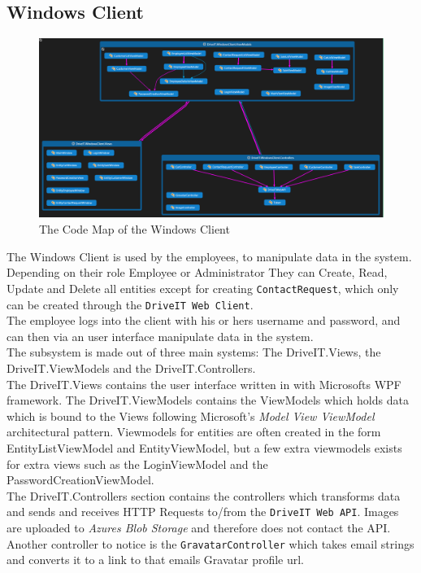 \subsection{Windows Client} 
\begin{figure}[H]
	\centering
	\includegraphics[width=\textwidth]{Figures/WindowsClientCodeMap}
	\caption{The Code Map of the Windows Client}
	\label{fig:WindowsClientCodeMap}
\end{figure}
The Windows Client is used by the employees, to manipulate data in the system. Depending on their role Employee or Administrator They can Create, Read, Update and Delete all entities except for creating \texttt{ContactRequest}, which only can be created through the \texttt{DriveIT Web Client}.\\
The employee logs into the client with his or hers username and password, and can then via an user interface manipulate data in the system.\\
The subsystem is made out of three main systems: The DriveIT.Views, the DriveIT.ViewModels and the DriveIT.Controllers.\\
The DriveIT.Views contains the user interface written in with Microsofts WPF framework. The DriveIT.ViewModels contains the ViewModels which holds data which is bound to the Views following Microsoft's \emph{Model View ViewModel} architectural pattern. Viewmodels for entities are often created in the form EntityListViewModel and EntityViewModel, but a few extra viewmodels exists for extra views such as the LoginViewModel and the PasswordCreationViewModel.\\
The DriveIT.Controllers section contains the controllers which transforms data and sends and receives HTTP Requests to/from the \texttt{DriveIT Web API}. Images are uploaded to \emph{Azures Blob Storage} and therefore does not contact the API. Another controller to notice is the \texttt{GravatarController} which takes email strings and converts it to a link to that emails Gravatar profile url.

